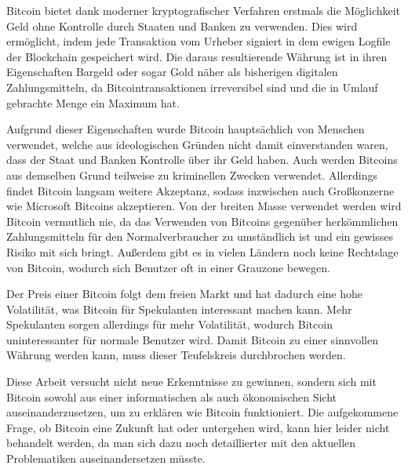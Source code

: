 Bitcoin bietet dank moderner kryptografischer Verfahren erstmals die Möglichkeit Geld ohne Kontrolle durch Staaten und Banken zu verwenden.
Dies wird ermöglicht, indem jede Transaktion vom Urheber signiert in dem ewigen Logfile der Blockchain gespeichert wird.
Die daraus resultierende Währung ist in ihren Eigenschaften Bargeld oder sogar Gold näher als bisherigen digitalen Zahlungsmitteln, da Bitcointransaktionen irreversibel sind und die in Umlauf gebrachte Menge ein Maximum hat.

Aufgrund dieser Eigenschaften wurde Bitcoin hauptsächlich von Menschen verwendet, welche aus ideologischen Gründen nicht damit einverstanden waren, dass der Staat und Banken Kontrolle über ihr Geld haben.
Auch werden Bitcoins aus demselben Grund teilweise zu kriminellen Zwecken verwendet.
Allerdings findet Bitcoin langsam weitere Akzeptanz, sodass inzwischen auch Großkonzerne wie Microsoft Bitcoins akzeptieren.
Von der breiten Masse verwendet werden wird Bitcoin vermutlich nie, da das Verwenden von Bitcoins gegenüber herkömmlichen Zahlungsmitteln für den Normalverbraucher zu umständlich ist und ein gewisses Risiko mit sich bringt.
Außerdem gibt es in vielen Ländern noch keine Rechtslage von Bitcoin, wodurch sich Benutzer oft in einer Grauzone bewegen.

Der Preis einer Bitcoin folgt dem freien Markt und hat dadurch eine hohe Volatilität, was Bitcoin für Spekulanten interessant machen kann.
Mehr Spekulanten sorgen allerdings für mehr Volatilität, wodurch Bitcoin uninteressanter für normale Benutzer wird.
Damit Bitcoin zu einer sinnvollen Währung werden kann, muss dieser Teufelskreis durchbrochen werden.

Diese Arbeit versucht nicht neue Erkenntnisse zu gewinnen, sondern sich mit Bitcoin sowohl aus einer informatischen als auch ökonomischen Sicht auseinanderzusetzen, um zu erklären wie Bitcoin funktioniert.
Die aufgekommene Frage, ob Bitcoin eine Zukunft hat oder untergehen wird, kann hier leider nicht behandelt werden, da man sich dazu noch detaillierter mit den aktuellen Problematiken auseinandersetzen müsste.
